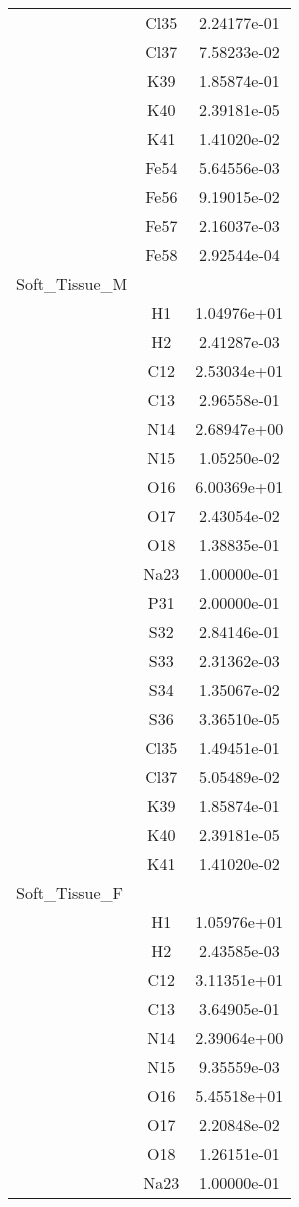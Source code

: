 \begin{centering}
\begin{longtable}{l c c}
& Cl35 & 2.24177e-01 \\ 
& Cl37 & 7.58233e-02 \\ 
& K39 & 1.85874e-01 \\ 
& K40 & 2.39181e-05 \\ 
& K41 & 1.41020e-02 \\ 
& Fe54 & 5.64556e-03 \\ 
& Fe56 & 9.19015e-02 \\ 
& Fe57 & 2.16037e-03 \\ 
& Fe58 & 2.92544e-04 \\ 
\hline
Soft_Tissue_M & & \\
\hline
& H1 & 1.04976e+01 \\ 
& H2 & 2.41287e-03 \\ 
& C12 & 2.53034e+01 \\ 
& C13 & 2.96558e-01 \\ 
& N14 & 2.68947e+00 \\ 
& N15 & 1.05250e-02 \\ 
& O16 & 6.00369e+01 \\ 
& O17 & 2.43054e-02 \\ 
& O18 & 1.38835e-01 \\ 
& Na23 & 1.00000e-01 \\ 
& P31 & 2.00000e-01 \\ 
& S32 & 2.84146e-01 \\ 
& S33 & 2.31362e-03 \\ 
& S34 & 1.35067e-02 \\ 
& S36 & 3.36510e-05 \\ 
& Cl35 & 1.49451e-01 \\ 
& Cl37 & 5.05489e-02 \\ 
& K39 & 1.85874e-01 \\ 
& K40 & 2.39181e-05 \\ 
& K41 & 1.41020e-02 \\ 
\hline
Soft_Tissue_F & & \\
\hline
& H1 & 1.05976e+01 \\ 
& H2 & 2.43585e-03 \\ 
& C12 & 3.11351e+01 \\ 
& C13 & 3.64905e-01 \\ 
& N14 & 2.39064e+00 \\ 
& N15 & 9.35559e-03 \\ 
& O16 & 5.45518e+01 \\ 
& O17 & 2.20848e-02 \\ 
& O18 & 1.26151e-01 \\ 
& Na23 & 1.00000e-01 \\ 

\end{longtable}
\end{centering}
